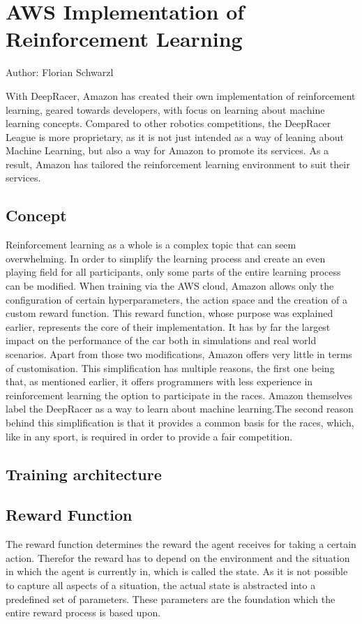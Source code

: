 \chapter{AWS Implementation of Reinforcement Learning}
Author: Florian Schwarzl

With DeepRacer, Amazon has created their own implementation of reinforcement learning, geared towards developers, with focus on learning about machine learning concepts. Compared to other robotics competitions, the DeepRacer League is more proprietary, as it is not just intended as a way of leaning about Machine Learning, but also a way for Amazon to promote its services. As a result, Amazon has tailored the reinforcement learning environment to suit their services. 

\section{Concept}
Reinforcement learning as a whole is a complex topic that can seem overwhelming. In order to simplify the learning process and create an even playing field for all participants, only some parts of the entire learning process can be modified. When training via the AWS cloud, Amazon allows only the configuration of certain hyperparameters, the action space and the creation of a custom reward function. This reward function, whose purpose was explained earlier, represents the core of their implementation. It has by far the largest impact on the performance of the car both in simulations and real world scenarios. Apart from those two modifications, Amazon offers very little in terms of customisation. This simplification has multiple reasons, the first one being that, as mentioned earlier, it offers programmers with less experience in reinforcement learning the option to participate in the races. Amazon themselves label the DeepRacer as a way to learn about machine learning.The second reason behind this simplification is that it provides a common basis for the races, which, like in any sport, is required in order to provide a fair competition.

\section{Training architecture}

\section{Reward Function}
The reward function determines the reward the agent receives for taking a certain action. Therefor the reward has to depend on the environment and the situation in which the agent is currently in, which is called the state. As it is not possible to capture all aspects of a situation, the actual state is abstracted into a predefined set of parameters. These parameters are the foundation which the entire reward process is based upon. 

